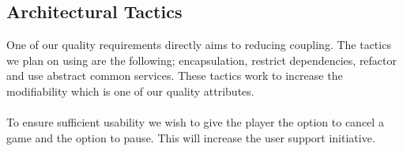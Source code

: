 \subsection{Architectural Tactics}

One of our quality requirements directly aims to reducing coupling. The tactics we plan on using are the following; encapsulation, restrict dependencies, refactor and use abstract common services. These tactics work to increase the modifiability which is one of our quality attributes.\\
\\
To ensure sufficient usability we wish to give the player the option to cancel a game and the option to pause. This will increase the user support initiative.\\
